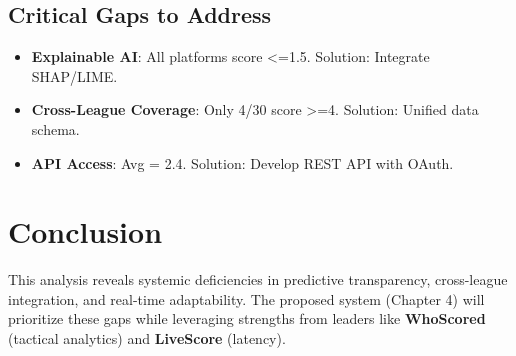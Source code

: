 \subsection{Critical Gaps to Address}
\begin{itemize}
    \item \textbf{Explainable AI}: All platforms score <=1.5. Solution: Integrate SHAP/LIME.
    \item \textbf{Cross-League Coverage}: Only 4/30 score >=4. Solution: Unified data schema.
    \item \textbf{API Access}: Avg = 2.4. Solution: Develop REST API with OAuth.
\end{itemize}

\section{Conclusion}
This analysis reveals systemic deficiencies in predictive transparency, cross-league integration, and real-time adaptability. The proposed system (Chapter 4) will prioritize these gaps while leveraging strengths from leaders like \textbf{WhoScored} (tactical analytics) and \textbf{LiveScore} (latency).